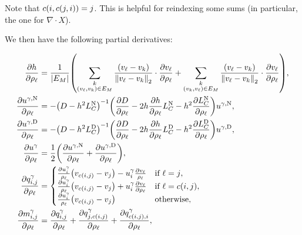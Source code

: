 Note that \(c\pof{i, c\pof{j, i}} = j\). This is helpful for reindexing some sums (in particular, the one for \(\nabla \cdot X\)).

We then have the following partial derivatives:

\begin{align*}
	\frac{\partial h}{\partial \rho_\ell} &= \frac{1}{\abs{E_M}}\pof{\sum_{\substack{k \\ \pof{v_\ell, v_k} \in E_M}} \frac{\pof{v_\ell - v_k}}{\norm{v_\ell - v_k}_2} \cdot \frac{\partial v_\ell}{\partial \rho_\ell} + \sum_{\substack{k \\ \pof{v_k, v_\ell} \in E_M}} \frac{\pof{v_\ell - v_k}}{\norm{v_\ell - v_k}_2} \cdot \frac{\partial v_\ell}{\partial \rho_\ell}}, \\
	\frac{\partial u^{\gamma, \text{N}}}{\partial \rho_\ell} &= -\pof{D - h^2L_C^{\text{N}}}^{-1}\pof{\frac{\partial D}{\partial \rho_\ell} - 2h\frac{\partial h}{\partial \rho_\ell}L_C^{\text{N}} - h^2\frac{\partial L_C^{\text{N}}}{\partial \rho_\ell}}u^{\gamma, \text{N}}, \\
	\frac{\partial u^{\gamma, \text{D}}}{\partial \rho_\ell} &= -\pof{D - h^2L_C^{\text{D}}}^{-1}\pof{\frac{\partial D}{\partial \rho_\ell} - 2h\frac{\partial h}{\partial \rho_\ell}L_C^{\text{D}} - h^2\frac{\partial L_C^{\text{D}}}{\partial \rho_\ell}}u^{\gamma, \text{D}}, \\
	\frac{\partial u^\gamma}{\partial \rho_\ell} &= \frac{1}{2}\pof{\frac{\partial u^{\gamma, \text{N}}}{\partial \rho_\ell} + \frac{\partial u^{\gamma, \text{D}}}{\partial \rho_\ell}}, \\
	\frac{\partial q^\gamma_{i, j}}{\partial \rho_\ell} &= \begin{cases}
		\frac{\partial u^\gamma_i}{\rho_\ell}\pof{v_{c\pof{i, j}} - v_j} - u^\gamma_i\frac{\partial v_\ell}{\rho_\ell} & \text{if \(\ell = j\)}, \\
		\frac{\partial u^\gamma_i}{\rho_\ell}\pof{v_{c\pof{i, j}} - v_j} + u^\gamma_i\frac{\partial v_\ell}{\partial \rho_\ell} & \text{if \(\ell = c\pof{i, j}\)}, \\
		\frac{\partial u^\gamma_i}{\rho_\ell}\pof{v_{c\pof{i, j}} - v_j} & \text{otherwise},
	\end{cases} \\
	\frac{\partial m^\gamma_{i, j}}{\partial \rho_\ell} &= \frac{\partial q^\gamma_{i, j}}{\partial \rho_\ell} + \frac{\partial q^\gamma_{j, c\pof{i, j}}}{\partial \rho_\ell} + \frac{\partial q^\gamma_{c\pof{i, j}, i}}{\partial \rho_\ell}, \\

\end{align*}
